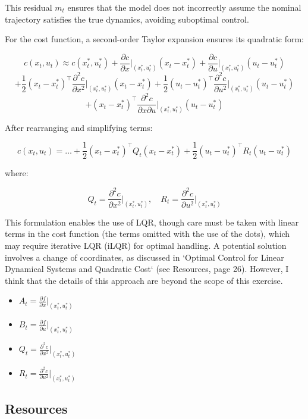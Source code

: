 This residual $m_t$ ensures that the model does not incorrectly assume the nominal trajectory satisfies the true dynamics, avoiding suboptimal control.

For the cost function, a second-order Taylor expansion ensures its quadratic form:

\[
    c(x_t, u_t) \approx c(x_t^*, u_t^*) + \frac{\partial c}{\partial x} \bigg|_{(x_t^*, u_t^*)} (x_t - x_t^*) + \frac{\partial c}{\partial u} \bigg|_{(x_t^*, u_t^*)} (u_t - u_t^*)
\]
\[
    + \frac{1}{2} (x_t - x_t^*)^\top \frac{\partial^2 c}{\partial x^2} \bigg|_{(x_t^*, u_t^*)} (x_t - x_t^*) + \frac{1}{2} (u_t - u_t^*)^\top \frac{\partial^2 c}{\partial u^2} \bigg|_{(x_t^*, u_t^*)} (u_t - u_t^*)
\]
\[
    + (x_t - x_t^*)^\top \frac{\partial^2 c}{\partial x \partial u} \bigg|_{(x_t^*, u_t^*)} (u_t - u_t^*)
\]

After rearranging and simplifying terms:

\[
    c(x_t, u_t) = \dots + \frac{1}{2} (x_t - x_t^*)^\top Q_t (x_t - x_t^*) + \frac{1}{2} (u_t - u_t^*)^\top R_t (u_t - u_t^*)
\]

where:

\[
    Q_t = \frac{\partial^2 c}{\partial x^2} \bigg|_{(x_t^*, u_t^*)}, \quad R_t = \frac{\partial^2 c}{\partial u^2} \bigg|_{(x_t^*, u_t^*)}
\]

This formulation enables the use of LQR, though care must be taken with linear terms in the cost function (the terms omitted with the use of the dots), which may require iterative LQR (iLQR) for optimal handling. A potential solution involves a change of coordinates, as discussed in `Optimal Control for Linear Dynamical Systems and Quadratic Cost` (see Resources, page 26). However, I think that the details of this approach are beyond the scope of this exercise.

\begin{itemize}
    \item $A_t = \frac{\partial f}{\partial x} \bigg|_{(x_t^*, u_t^*)}$
    \item $B_t = \frac{\partial f}{\partial u} \bigg|_{(x_t^*, u_t^*)}$
    \item $Q_t = \frac{\partial^2 c}{\partial x^2} \bigg|_{(x_t^*, u_t^*)}$
    \item $R_t = \frac{\partial^2 c}{\partial u^2} \bigg|_{(x_t^*, u_t^*)}$
\end{itemize}


\subsection*{Resources}


